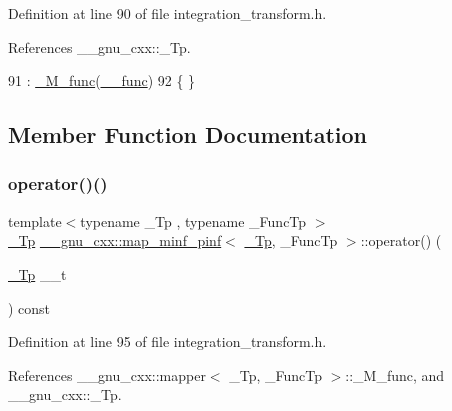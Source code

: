 Definition at line 90 of file integration\+\_\+transform.\+h.



References \+\_\+\+\_\+gnu\+\_\+cxx\+::\+\_\+\+Tp.


\begin{DoxyCode}
91       : \hyperlink{struct____gnu__cxx_1_1map__minf__pinf_a38f287d24e3b40dc964637ac5e8f2532}{\_M\_func}(\hyperlink{namespace____gnu__cxx_af2b2f0c7a2ae72b922b1afefae5a65b2}{\_\_func})
92       \{ \}
\end{DoxyCode}


\subsection{Member Function Documentation}
\mbox{\label{struct____gnu__cxx_1_1map__minf__pinf_a39669672f547fb7979406452ec84bbc7}} 
\subsubsection{\texorpdfstring{operator()()}{operator()()}}
{\footnotesize\ttfamily template$<$typename \+\_\+\+Tp , typename \+\_\+\+Func\+Tp $>$ \\
\hyperlink{namespace____gnu__cxx_a3b19a9c800ca194374ef9172290f7d79}{\+\_\+\+Tp} \hyperlink{struct____gnu__cxx_1_1map__minf__pinf}{\+\_\+\+\_\+gnu\+\_\+cxx\+::map\+\_\+minf\+\_\+pinf}$<$ \hyperlink{namespace____gnu__cxx_a3b19a9c800ca194374ef9172290f7d79}{\+\_\+\+Tp}, \+\_\+\+Func\+Tp $>$\+::operator() (\begin{DoxyParamCaption}\item[{\hyperlink{namespace____gnu__cxx_a3b19a9c800ca194374ef9172290f7d79}{\+\_\+\+Tp}}]{\+\_\+\+\_\+t }\end{DoxyParamCaption}) const\hspace{0.3cm}{\ttfamily [inline]}}



Definition at line 95 of file integration\+\_\+transform.\+h.



References \+\_\+\+\_\+gnu\+\_\+cxx\+::mapper$<$ \+\_\+\+Tp, \+\_\+\+Func\+Tp $>$\+::\+\_\+\+M\+\_\+func, and \+\_\+\+\_\+gnu\+\_\+cxx\+::\+\_\+\+Tp.


